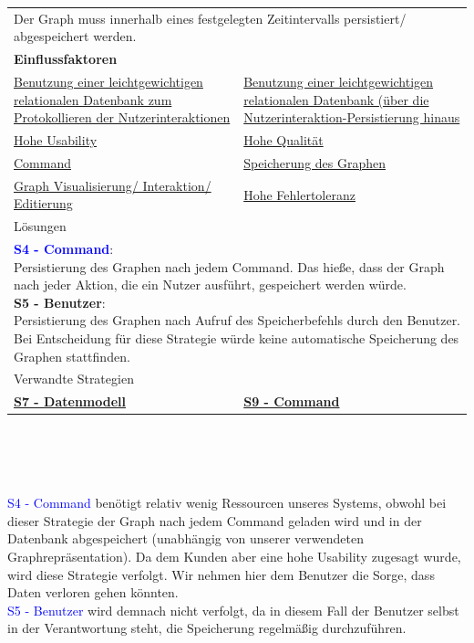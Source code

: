 \documentclass[enabledeprecatedfontcommands,fontsize=11pt,paper=a4,twoside]{scrartcl}
\newcounter{one}
\newcounter{two}[one]
\newcommand{\cb}[1]{{\textcolor{blue}{#1}}}
\begin{document}
\newpage
\begin{tabular} {|p{8cm} p{8cm}|}
	\hline
	\rowcolor{prob}\multicolumn{2}{|l|}{\parbox{16cm}{\textbf{02: Persistierungsintervall des Graphen}}} \\  \hline\hline 
	\multicolumn{2}{|l|}{\parbox{16cm}{Der Graph muss innerhalb eines festgelegten Zeitintervalls persistiert/ abgespeichert werden.}}\rule{0pt}{1ex}\\  \hline
	\multicolumn{2}{|l|}{\textbf{Einflussfaktoren}}\\
	\hyperlink {d}{Benutzung einer leichtgewichtigen relationalen Datenbank zum Protokollieren der Nutzerinteraktionen}&
	\hyperlink {e}{Benutzung einer leichtgewichtigen relationalen Datenbank (über die Nutzerinteraktion-Persistierung hinaus}\\
	\hyperlink {g}{Hohe Usability}&
	\hyperlink {h}{Hohe Qualität}\\
	\hyperlink {i}{Command} & 
	\hyperlink {v}{Speicherung des Graphen} \\
	\hyperlink {aa}{Graph Visualisierung/ Interaktion/ Editierung}  &  
	\hyperlink {tt}{Hohe Fehlertoleranz}    \\
	\hline
	\multicolumn{2}{|l|}{Lösungen} \\
	\multicolumn{2}{|l|}{\parbox{16cm}{
			\textbf{\cb{\hypertarget{zz}{S4 - Command}}}: \\
			Persistierung des Graphen nach jedem Command. Das hieße, dass der Graph nach jeder Aktion, die ein Nutzer ausführt, gespeichert werden würde. \\
			\textbf{S5 - Benutzer}: \\
			Persistierung des Graphen nach Aufruf des Speicherbefehls durch den Benutzer. Bei Entscheidung für diese Strategie würde keine automatische Speicherung des Graphen stattfinden.
	} }\\ [6ex] \hline
	\multicolumn{2}{|l|}{Verwandte Strategien} \\
	\textbf{\hyperlink {aaa}{S7 - Datenmodell}} &
	\textbf{\hyperlink {command}{S9 - Command}}
	\\\hline
\end{tabular}\\ \\ \\
\begin{onehalfspace}
	\cb{S4 - Command} benötigt relativ wenig Ressourcen unseres Systems, obwohl bei dieser Strategie der Graph nach jedem Command geladen wird und in der Datenbank abgespeichert (unabhängig von unserer verwendeten Graphrepräsentation).
	Da dem Kunden aber eine hohe Usability zugesagt wurde, wird diese Strategie verfolgt. Wir nehmen hier dem Benutzer die Sorge, dass Daten verloren gehen könnten. \\
	\cb{S5 - Benutzer} wird demnach nicht verfolgt, da in diesem Fall der Benutzer selbst in der Verantwortung steht, die Speicherung regelmäßig durchzuführen. \\
\end{onehalfspace}
\end{document}
